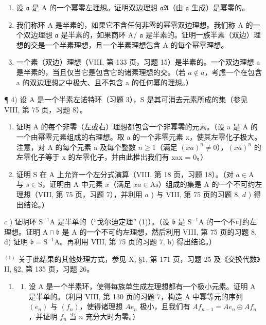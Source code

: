 \begin{enumerate}
\def\labelenumi{\alph{enumi})}
\item
  设 \(\mathfrak{a}\) 是 A 的一个幂零左理想。证明双边理想 \(\mathfrak{aA}\)（由 \(\mathfrak{a}\) 生成）是幂零的。
\item
  我们称环 A 是半素的，如果它不含任何非零的幂零双边理想。我们称 A 的一个双边理想 \(\mathfrak{a}\) 是半素的，如果商环 A/ \(\mathfrak{a}\) 是半素的。证明一族半素（双边）理想的交是一个半素理想，且一个半素理想包含 A 的每个幂零理想。
\item
  一个素（双边）理想（VIII, 第 133 页，习题 15）是半素的。一个双边理想 a 是半素的，当且仅当它是包含它的诸素理想的交。（若 \(a \notin a\)，考虑一个在包含 a 的双边理想之中极大、且不包含 a 的任何幂的理想。）
\end{enumerate}

¶ 4) 设 A 是一个半素左诺特环（习题 3），S 是其可消去元素所成的集（参见 VIII, 第 75 页，习题 8）。

\begin{enumerate}
\def\labelenumi{\alph{enumi})}
\item
  证明 A 的每个非零（左或右）理想都包含一个非幂零的元素。（设 a 是 A 的一个由幂零元素组成的右理想。取 a 的一个非零元素 x，使其左零化子极大。注意，对 A 的每个元素 a 及每个整数 \(n \geqslant 1\)（满足 \((xa)^{n} \neq 0\)），\((xa)^{n}\) 的左零化子等于 x 的左零化子，并由此推出我们有 xax = 0。）
\item
  证明 S 在 A 上允许一个左分式演算（VIII, 第 18 页，习题 18）。（对 \(a \in \mathrm{A}\) 与 \(s \in \mathrm{S}\)，证明由 A 中元素 \(x\)（满足 \(xa \in \mathrm{As}\)）组成的集是 A 的一个不可约左理想（VIII, 第 75 页，习题 7），并利用 \(a\) ) 与 VIII, 第 75 页的习题 8, \(d\) ) 得出结论。）
\end{enumerate}

\(c\) ) 证明环 \(\mathrm{S}^{-1}\mathrm{A}\) 是半单的（``戈尔迪定理'' (1)）。（设 \(\mathfrak{b}\) 是 \(\mathrm{S}^{-1}\mathrm{A}\) 的一个不可约左理想。证明 \(\mathrm{A} \cap \mathfrak{b}\) 是 A 的一个不可约左理想，然后利用 VIII, 第 75 页的习题 8, d) 证明 \(\mathfrak{b} = \mathrm{S}^{-1}\mathrm{A}\)。再利用 VIII, 第 75 页的习题 7, b) 得出结论。）

\( ^{(1)} \) 关于此结果的其他处理方式，参见 X, §1, 第 171 页，习题 25 及《交换代数》II, §2, 第 135 页，习题 26。

\begin{enumerate}
\def\labelenumi{\arabic{enumi})}
\setcounter{enumi}{4}
\tightlist
\item
  \begin{enumerate}
  \def\labelenumii{\alph{enumii})}
  \tightlist
  \item
    设 A 是一个半素环，使得每族单生成左理想都有一个极小元素。证明 A 是半单的。（利用 VIII, 第 130 页的习题 7，构造 A 中幂等元的序列 \((e_n)\) 与 \((f_n)\)，使得诸理想 \(Ae_n\) 极小，且我们有 \(A f_{n-1} = Ae_n \oplus Af_n\)，并证明 \(f_n\) 当 \(n\) 充分大时为零。）
  \end{enumerate}
\end{enumerate}

